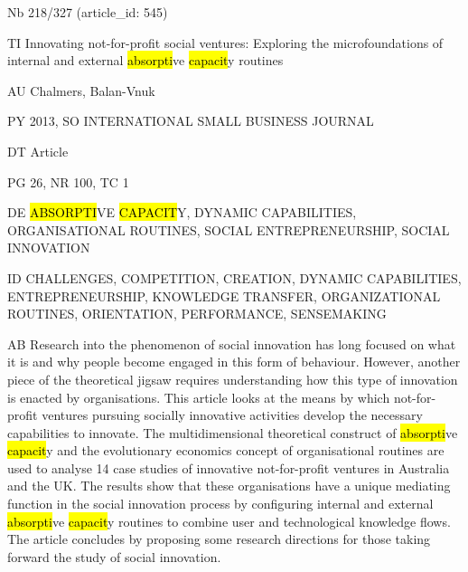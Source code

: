 \documentclass[a4paper]{article}
\begin{document}
\vspace*{-2cm}
Nb \tabto{0cm}218/327 (article\_id: 545)\par
TI \tabto{0cm}Innovating not-for-profit social ventures: Exploring the microfoundations of internal and external \hl{absorpti}ve \hl{capacit}y routines\par
AU \tabto{0cm}Chalmers, Balan-Vnuk\par
PY \tabto{0cm}2013, SO INTERNATIONAL SMALL BUSINESS JOURNAL\par
DT \tabto{0cm}Article\par
PG \tabto{0cm}26, NR 100, TC 1\par
DE \tabto{0cm}\hl{ABSORPTI}VE \hl{CAPACIT}Y, DYNAMIC CAPABILITIES, ORGANISATIONAL ROUTINES, SOCIAL ENTREPRENEURSHIP, SOCIAL INNOVATION\par
ID \tabto{0cm}CHALLENGES, COMPETITION, CREATION, DYNAMIC CAPABILITIES, ENTREPRENEURSHIP, KNOWLEDGE TRANSFER, ORGANIZATIONAL ROUTINES, ORIENTATION, PERFORMANCE, SENSEMAKING\par
AB \tabto{0cm}Research into the phenomenon of social innovation has long focused on what it is and why people become engaged in this form of behaviour. However, another piece of the theoretical jigsaw requires understanding how this type of innovation is enacted by organisations. This article looks at the means by which not-for-profit ventures pursuing socially innovative activities develop the necessary capabilities to innovate. The multidimensional theoretical construct of \hl{absorpti}ve \hl{capacit}y and the evolutionary economics concept of organisational routines are used to analyse 14 case studies of innovative not-for-profit ventures in Australia and the UK. The results show that these organisations have a unique mediating function in the social innovation process by configuring internal and external \hl{absorpti}ve \hl{capacit}y routines to combine user and technological knowledge flows. The article concludes by proposing some research directions for those taking forward the study of social innovation.\par
\clearpage
\end{document}
